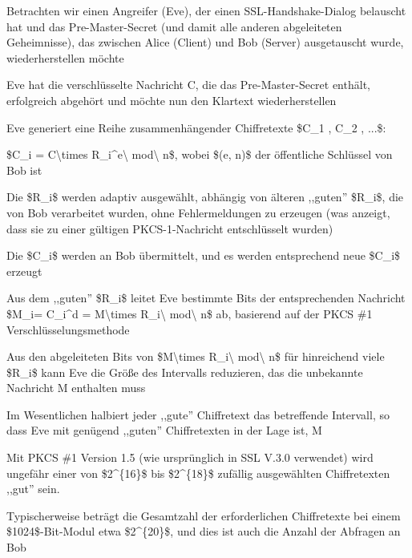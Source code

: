 \documentclass[a4paper]{article}
\begin{document}
\begin{multicols}{3}
\begin{itemize*}
\begin{itemize*}
                  \begin{itemize*}
                        \item Betrachten wir einen Angreifer (Eve), der einen SSL-Handshake-Dialog belauscht hat und das Pre-Master-Secret (und damit alle anderen abgeleiteten Geheimnisse), das zwischen Alice (Client) und Bob (Server) ausgetauscht wurde, wiederherstellen möchte
                        \item Eve hat die verschlüsselte Nachricht C, die das Pre-Master-Secret enthält, erfolgreich abgehört und möchte nun den Klartext wiederherstellen
                        \item Eve generiert eine Reihe zusammenhängender Chiffretexte \$C\_1 , C\_2 , ...\$:
                        \begin{itemize*} \item \$C\_i = C\textbackslash times R\_i\^{}e\textbackslash{} mod\textbackslash{} n\$, wobei \$(e, n)\$ der öffentliche Schlüssel von Bob ist \item Die \$R\_i\$ werden adaptiv ausgewählt, abhängig von älteren ,,guten'' \$R\_i\$, die von Bob verarbeitet wurden, ohne Fehlermeldungen zu erzeugen (was anzeigt, dass sie zu einer gültigen PKCS-1-Nachricht entschlüsselt wurden) \item Die \$C\_i\$ werden an Bob übermittelt, und es werden entsprechend neue \$C\_i\$ erzeugt \item Aus dem ,,guten'' \$R\_i\$ leitet Eve bestimmte Bits der entsprechenden Nachricht \$M\_i= C\_i\^{}d = M\textbackslash times R\_i\textbackslash{} mod\textbackslash{} n\$ ab, basierend auf der PKCS \#1 Verschlüsselungsmethode \end{itemize*}
                        \item Aus den abgeleiteten Bits von \$M\textbackslash times R\_i\textbackslash{} mod\textbackslash{} n\$ für hinreichend viele \$R\_i\$ kann Eve die Größe des Intervalls reduzieren, das die unbekannte Nachricht M enthalten muss
                        \item Im Wesentlichen halbiert jeder ,,gute'' Chiffretext das betreffende Intervall, so dass Eve mit genügend ,,guten'' Chiffretexten in der Lage ist, M
                        \item Mit PKCS \#1 Version 1.5 (wie ursprünglich in SSL V.3.0 verwendet) wird ungefähr einer von \$2\^{}\{16\}\$ bis \$2\^{}\{18\}\$ zufällig ausgewählten Chiffretexten ,,gut'' sein.
                        \item Typischerweise beträgt die Gesamtzahl der erforderlichen Chiffretexte bei einem \$1024\$-Bit-Modul etwa \$2\^{}\{20\}\$, und dies ist auch die Anzahl der Abfragen an Bob

\end{itemize*}
\end{itemize*}
\end{itemize*}
\end{multicols}
\end{document}
